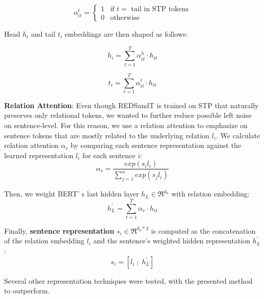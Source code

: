 \documentclass[11pt,a4paper]{article}
\begin{document}
\begin{equation}
  \alpha_{it}^{t} =
    \begin{cases}
      1& \text{if $t= $ tail in STP tokens} \\
      0&  \text{otherwise}
    \end{cases}       
\end{equation}

Head $h_i$ and tail $t_i$ embeddings are then shaped as follows:

\noindent\begin{minipage}{.5\linewidth}
\begin{equation}
  h_i = \sum_{t=1}^{T}\alpha_{it}^{h}\cdot h_{it}
\end{equation}
\end{minipage}\begin{minipage}{.5\linewidth}
\begin{equation}
  t_i = \sum_{t=1}^{T}\alpha_{it}^{t}\cdot h_{it}
\end{equation}
\end{minipage}
\smallskip
\newline
\textbf{Relation Attention}:
Even though REDSandT is trained on STP that naturally preserves only relational tokens, we wanted to further reduce possible left noise on sentence-level. For this reason, we use a relation attention to emphasize on sentence tokens that are mostly related to the underlying relation $l_i$. We calculate relation attention $\alpha_r$ by comparing each sentence representation against the learned representation $l_i$ for each sentence $i$:
\begin{equation}
  \alpha_r=\frac{exp(s_i l_i)}{\sum_{j=1}^{n} exp(s_j l_i)}
\end{equation}

Then, we weight BERT' s last hidden layer $h_L \in \Re^{d_h}$ with relation embedding:
\begin{equation}
  h_L^{'} = \sum_{t=1}^{T}\alpha_{r}\cdot h_{it}
\end{equation}

Finally, \textbf{sentence representation} $s_i \in \Re^{d_h*2}$ is computed as the concatenation of the relation embedding $l_i$ and the sentence's weighted hidden representation $h_L^{'}$:
\begin{equation}
  s_i = \left[  l_i\; ; \; h_L^{'}  \right]
\end{equation}

Several other representation techniques were tested, with the presented method to outperform.
\end{document}
